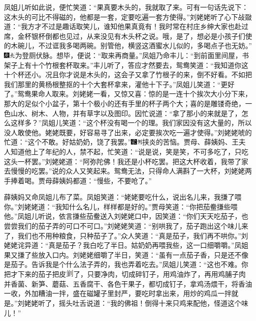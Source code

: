 凤姐儿听如此说，便忙笑道：``果真要木头的，我就取了来。可有一句话先说下：这木头的可比不得磁的，他都是一套，定要吃遍一套方使得。''刘姥姥听了心下敁敠道：``我方才不过是趣话取笑儿，谁知他果真竟有！我时常在村庄乡绅大家也赴过席，金杯银杯倒都也见过，从来没见有木头杯之说。哦，是了，想必是小孩子们使的木碗儿，不过诓我多喝两碗。别管他，横竖这酒蜜水儿似的，多喝点子也无妨。''{\includegraphics[width=3mm]{../Images/00004}\includegraphics[width=3mm]{../Images/00012}\footnotesize \kaishu 为登厕伏脉。}想毕，便说：``取来再商量。''凤姐乃命丰儿：``到前面里间屋，书架子上有十个竹根套杯取来。''丰儿听了，答应才然要去，鸳鸯笑道：``我知道你这十个杯还小。况且你才说是木头的，这会子又拿了竹根子的来，倒不好看。不如把我们那里的黄杨根整抠的十个大套杯拿来，灌他十下子。''凤姐儿笑道：``更好了。''鸳鸯果命人取来。刘姥姥一看，又惊又喜：惊的是一连十个挨次大小分下来，那大的足似个小盆子，第十个极小的还有手里的杯子两个大；喜的是雕镂奇绝，一色山水、树木、人物，并有草字以及图印。因忙说道：``拿了那小的来就是了，怎么这样多？''凤姐儿笑道：``这个杯没有喝一个的理。我们家因没有这大量的，所以没人敢使他。姥姥既要，好容易寻了出来，必定要挨次吃一遍才使得。''刘姥姥唬的忙道：``这个不敢。好姑奶奶，饶了我罢。''{\includegraphics[width=3mm]{../Images/00006}\includegraphics[width=3mm]{../Images/00011}\footnotesize \kaishu 挟炎的苦恼。}贾母、薛姨妈、王夫人知道他上了年纪的人，禁不起，忙笑道：``说是说，笑是笑，不可多吃了，只吃这头一杯罢。''刘姥姥道：``阿弥陀佛！我还是小杯吃罢。把这大杯收着，我带了家去慢慢的吃罢。''说的众人又笑起来。鸳鸯无法，只得命人满斟了一大杯，刘姥姥两手捧着喝。贾母薛姨妈都道：``慢些，不要呛了。''

薛姨妈又命凤姐儿布了菜。凤姐笑道：``姥姥要吃什么，说出名儿来，我搛了喂你。''刘姥姥道：``我知什么名儿，样样都是好的。''贾母笑道：``你把茄鲞搛些喂他。''凤姐儿听说，依言搛些茄鲞送入刘姥姥口中，因笑道：``你们天天吃茄子，也尝尝我们的茄子弄的可口不可口。''刘姥姥笑道：``别哄我了，茄子跑出这个味儿来了，我们也不用种粮食，只种茄子了。''众人笑道：``真是茄子，我们再不哄你。''刘姥姥诧异道：``真是茄子？我白吃了半日。姑奶奶再喂我些，这一口细嚼嚼。''凤姐果又搛了些放入口内。刘姥姥细嚼了半日，笑道：``虽有一点茄子香，只是还不像是茄子。告诉我是个什么法子弄的，我也弄着吃去。''凤姐儿笑道：``这也不难。你把才下来的茄子把皮\includegraphics[width=4mm]{../images/00027}了，只要净肉，切成碎钉子，用鸡油炸了，再用鸡脯子肉并香菌、新笋、蘑菇、五香腐干、各色干果子，都切成钉子，拿鸡汤煨干，将香油一收，外加糟油一拌，盛在磁罐子里封严，要吃时拿出来，用炒的鸡瓜一拌就是。''刘姥姥听了，摇头吐舌说道：``我的佛祖！倒得十来只鸡来配他，怪道这个味儿！''

